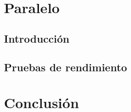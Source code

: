 \documentclass[12pt]{article}
\newcommand\blankpage{%
    \null
    \thispagestyle{empty}%
    \addtocounter{page}{-1}%
    \newpage}
\begin{document}
    \section{Paralelo}
        \subsection{Introducción}
        \noindent
        \subsection{Pruebas de rendimiento}
        \noindent
    \newpage
    \section{Conclusión}
    \noindent
    \newpage
    \blankpage
\end{document}

